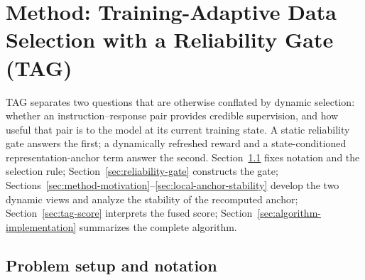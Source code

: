 \section{Method: Training-Adaptive Data Selection with a Reliability Gate (\textsc{TAG})}
\label{sec:method}
\textsc{TAG} separates two questions that are otherwise conflated by
dynamic selection: whether an instruction--response pair provides
credible supervision, and how useful that pair is to the model at its
current training state. A static reliability gate answers the first;
a dynamically refreshed reward and a state-conditioned
representation-anchor term answer the second.
Section~\ref{sec:problem-setup} fixes notation and the selection
rule; Section~\ref{sec:reliability-gate} constructs the gate;
Sections~\ref{sec:method-motivation}--\ref{sec:local-anchor-stability}
develop the two dynamic views and analyze the stability of the
recomputed anchor; Section~\ref{sec:tag-score} interprets the fused
score; Section~\ref{sec:algorithm-implementation} summarizes the
complete algorithm.

\subsection{Problem setup and notation}
\label{sec:problem-setup}

